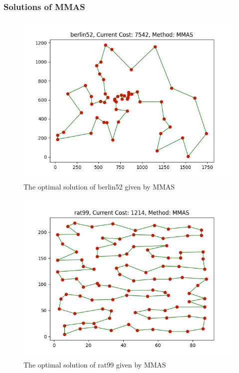 \documentclass[twocolumn, a4paper]{extarticle}
\begin{document}
\subsubsection{Solutions of MMAS}

\begin{figure}[H]
	\centering
	\includegraphics[width=0.95\linewidth]{figure/mmas_berlin52}
	\caption{The optimal solution of berlin52 given by MMAS}
	\label{fig:mmasberlin52}
\end{figure}

\begin{figure}[H]
	\centering
	\includegraphics[width=0.95\linewidth]{figure/mass_rat99}
	\caption{The optimal solution of rat99 given by MMAS}
	\label{fig:massrat99}
\end{figure}
\end{document}
